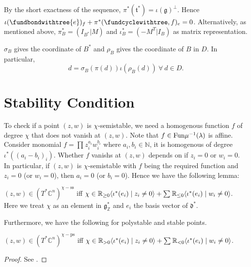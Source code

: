 \documentclass[b5paper]{article}
\newcommand{\sstab}{\mathrm{ss}}
\newcommand{\pstab}{\mathrm{ps}}
\begin{document}
\begin{remark}
  By the short exactness of the sequence, $\pi^*(\mathfrak{t}^*)=\iota(\mathfrak{g})^\perp $. Hence $\iota(\fundbondwithtree{e})_f+\pi^*(\fundcyclewithtree,f)_e=0$.
  Alternatively, as mentioned above, $\pi^*_B=(I_{B^*}|M)$ and $\iota^*_B=(-M^T|I_B)$ as matrix representation.
\end{remark}

\begin{proposition}[pps:]{}
  $\sigma_B$ gives the coordinate of $B^*$ and $\rho_B$ gives the coordinate of $B$ in $D$. In particular,
  \[
    d=\sigma_B(\pi(d))\iota(\rho_B(d))\ \forall\ d\in D.
  \]
\end{proposition}

\section{Stability Condition}

To check if a point $(z,w)$ is $\chi$-semistable, we need a homogenous function $f$ of degree $\chi$ that does not vanish at $(z,w)$. Note that $f\in \textnormal{Fun}\mu^{-1}(\lambda)$ is affine. Consider monomial $f=\prod_{}^{}z_i^{a_i}w_i^{b_i}$ where $a_i,b_i\in \mathbb{N}$, it is homogenous of degree $\iota^*((a_i-b_i)_i)$. Whether $f$ vanishs at $(z,w)$ depends on if $z_i=0$ or $w_i=0$. In particular, if $(z,w)$ is $\chi$-semistable with $f$ being the required function and $z_i=0$ (or $w_i=0$), then $a_i=0$ (or $b_i=0$). Hence we have the following lemma:

\begin{lemma}{}
  $(z,w)\in (T^*\mathbb{C}^n)^{\chi-\sstab}$  iff $\chi\in \mathbb{R}_{\geq 0}\langle \iota^{*}(e_i)\mid z_i\neq 0\rangle+\sum_{}^{}\mathbb{R}_{\leq 0}\langle \iota^{*}(e_i)\mid w_i\neq 0\rangle$. Here we treat $\chi$ as an element in $\mathfrak{g}^*_{\mathbb{Z}}$ and $e_i$ the basis vector of $\mathfrak{d}^*$.
\end{lemma}

Furthermore, we have the following for polystable and stable points.

\begin{proposition}{}
  $(z,w)\in (T^*\mathbb{C}^n)^{\chi-\pstab}$  iff $\chi\in \mathbb{R}_{> 0}\langle \iota^{*}(e_i)\mid z_i\neq 0\rangle+\sum_{}^{}\mathbb{R}_{< 0}\langle \iota^{*}(e_i)\mid w_i\neq 0\rangle$.
  \begin{proof}
      See \cite[Lemma 3.4.2]{konno2003variation}.
  \end{proof}
\end{proposition}
\end{document}
